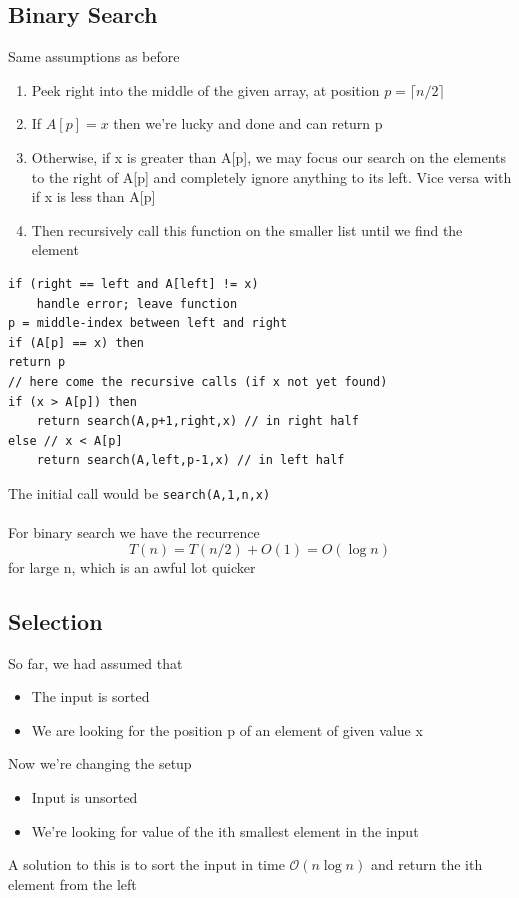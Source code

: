 \documentclass{article}[18pt]
\begin{document}
\subsection{Binary Search}
Same assumptions as before
\begin{enumerate}
	\item Peek right into the middle of the given array, at position $p=\lceil n/2 \rceil$
	\item If $A[p]=x$ then we're lucky and done and can return p
	\item Otherwise, if x is greater than A[p], we may focus our search on the elements to the right of A[p] and completely ignore anything to its left. Vice versa with if x is less than A[p]
	\item Then recursively call this function on the smaller list until we find the element
\end{enumerate}
\begin{lstlisting}[caption=int search ({int A[1..n], int left, int right, int x})]
if (right == left and A[left] != x)
	handle error; leave function
p = middle-index between left and right
if (A[p] == x) then
return p
// here come the recursive calls (if x not yet found)
if (x > A[p]) then
	return search(A,p+1,right,x) // in right half
else // x < A[p]
	return search(A,left,p-1,x) // in left half
\end{lstlisting}
The initial call would be \texttt{search(A,1,n,x)}\\
\\
For binary search we have the recurrence
\[
T(n)=T(n / 2)+O(1)=O(\log n)
\]
for large n, which is an awful lot quicker
\subsection{Selection}
So far, we had assumed that
\begin{itemize}
	\item The input is sorted
	\item We are looking for the position p of an element of given value x
\end{itemize}
Now we're changing the setup
\begin{itemize}
	\item Input is unsorted
	\item We're looking for value of the ith smallest element in the input
\end{itemize}
A solution to this is to sort the input in time $\mathcal{O}(n\log n)$ and return the ith element from the left
\end{document}
